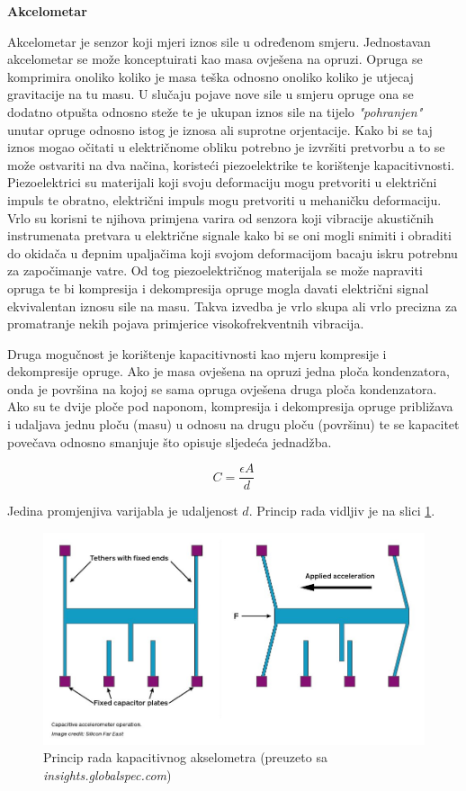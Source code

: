 \documentclass[times, utf8, diplomski]{fer}
\begin{document}
\textbf{Akcelometar}

Akcelometar je senzor koji mjeri iznos sile u određenom smjeru. Jednostavan akcelometar se može konceptuirati kao masa ovješena na 
opruzi. Opruga se komprimira onoliko koliko je masa teška odnosno onoliko koliko je utjecaj gravitacije na tu masu. U slučaju
pojave nove sile u smjeru opruge ona se dodatno otpušta odnosno steže te je ukupan iznos sile na tijelo \textit{"pohranjen"}
unutar opruge odnosno istog je iznosa ali suprotne orjentacije. Kako bi se taj iznos mogao očitati u električnome obliku potrebno
je izvršiti pretvorbu a to se može ostvariti na dva načina, koristeći piezoelektrike te korištenje kapacitivnosti. Piezoelektrici
su materijali koji svoju deformaciju mogu pretvoriti u električni impuls te obratno, električni impuls mogu pretvoriti u mehaničku
deformaciju. Vrlo su korisni te njihova primjena varira od senzora koji vibracije akustičnih instrumenata pretvara u električne
signale kako bi se oni mogli snimiti i obraditi do okidača u đepnim upaljačima koji svojom deformacijom bacaju iskru potrebnu za
započimanje vatre. Od tog piezoelektričnog materijala se može napraviti opruga te bi kompresija i dekompresija opruge mogla davati
električni signal ekvivalentan iznosu sile na masu. Takva izvedba je vrlo skupa ali vrlo precizna za promatranje nekih pojava 
primjerice visokofrekventnih vibracija.

Druga mogučnost je korištenje kapacitivnosti kao mjeru kompresije i dekompresije opruge. Ako je masa ovješena na opruzi jedna ploča
kondenzatora, onda je površina na kojoj se sama opruga ovješena druga ploča kondenzatora. Ako su te dvije ploče pod naponom,
kompresija i dekompresija opruge približava i udaljava jednu ploču (masu) u odnosu na drugu ploču (površinu) te se kapacitet
povečava odnosno smanjuje što opisuje sljedeća jednadžba.

$$
C = \frac{\epsilon A}{d}
$$

Jedina promjenjiva varijabla je udaljenost $d$. Princip rada vidljiv je na slici \ref{accmtr}.


\begin{figure}[h!]
    \includegraphics[width=\textwidth]{Accelerometers.jpg}
    \caption{Princip rada kapacitivnog akselometra (preuzeto sa \textit{insights.globalspec.com})}
    \label{accmtr}
\end{figure}
\end{document}
